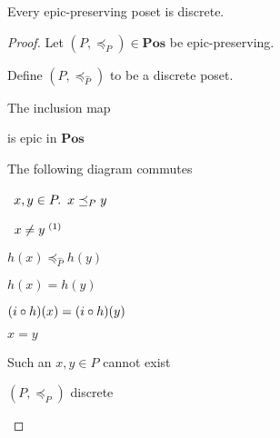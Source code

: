 \begin{prop}
  Every epic-preserving poset is discrete.

  \begin{proof}
    Let $(P,\preceq_P)\in\mathbf{Pos}$ be epic-preserving.
    \begin{itemize}
      \step
        Define $(P, \preceq_{\hat{P}})$ to be a discrete poset.

      \step[\imps]
        The inclusion map
        is epic in $\mathbf{Pos}$

      \step[\imps] The following diagram commutes
        \begin{center}
        \end{center}

      \step
        \begin{itemize}
          \subp{\star}
            \Let~$x,y\in P\ldotp~x\preceq_P y$
            \marginnote{\Hyp}

          \step
            \Ass~$x\neq y^{\text~(1)}$
            \marginnote{\Hyp}

          \step[\imps] $h(x) \preceq_{\hat{P}} h(y)$

          \step[\imps]
            $h(x) = h(y)$

          \step[\imps]
            $(i\circ h)(x) = (i\circ h)(y)$

          \step[\imps]
            $x = y$
        \end{itemize}
        \step[\contras] Such an $x,y\in P$ cannot exist

        \step[\imps] $(P, \preceq_P)$ discrete\qedhere
    \end{itemize}
  \end{proof}

\end{prop}

